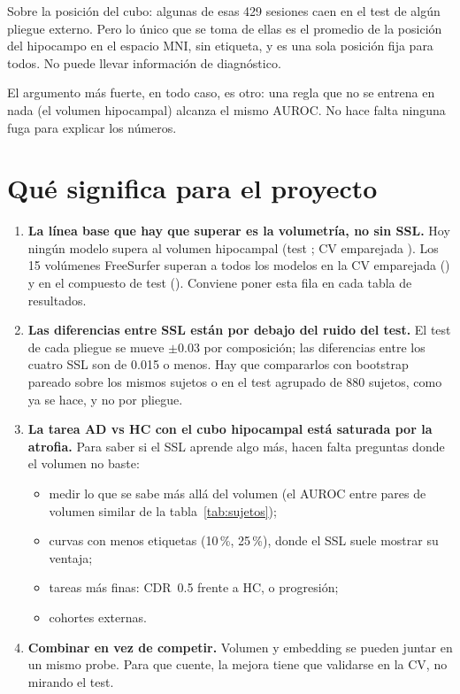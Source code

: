 \documentclass[11pt,a4paper]{article}
\begin{document}
Sobre la posición del cubo: algunas de esas 429 sesiones caen en el test de algún pliegue
externo. Pero lo único que se toma de ellas es el promedio de la posición del hipocampo
en el espacio MNI, sin etiqueta, y es una sola posición fija para todos. No puede llevar
información de diagnóstico.

El argumento más fuerte, en todo caso, es otro: una regla que no se entrena en nada (el
volumen hipocampal) alcanza el mismo AUROC. No hace falta ninguna fuga para explicar
los números.

\section{Qué significa para el proyecto}

\begin{ideabox}
\begin{enumerate}
  \item \textbf{La línea base que hay que superar es la volumetría, no sin SSL.} Hoy
        ningún modelo supera al volumen hipocampal (test \nvolTest; CV emparejada
        \nvolMatched). Los 15 volúmenes FreeSurfer superan a todos los modelos en la CV
        emparejada (\nasegMatched) y en el compuesto de test (\nasegComposite). Conviene
        poner esta fila en cada tabla de resultados.
  \item \textbf{Las diferencias entre SSL están por debajo del ruido del test.} El test
        de cada pliegue se mueve $\pm 0.03$ por composición; las diferencias entre los
        cuatro SSL son de 0.015 o menos. Hay que compararlos con bootstrap pareado
        sobre los mismos sujetos o en el test agrupado de 880 sujetos, como ya se hace,
        y no por pliegue.
  \item \textbf{La tarea AD vs HC con el cubo hipocampal está saturada por la atrofia.}
        Para saber si el SSL aprende algo más, hacen falta preguntas donde el volumen
        no baste:
        \begin{itemize}
          \item medir lo que se sabe más allá del volumen (el AUROC entre pares de
                volumen similar de la tabla~\ref{tab:sujetos});
          \item curvas con menos etiquetas (10\,\%, 25\,\%), donde el SSL suele mostrar
                su ventaja;
          \item tareas más finas: CDR~0.5 frente a HC, o progresión;
          \item cohortes externas.
        \end{itemize}
  \item \textbf{Combinar en vez de competir.} Volumen y embedding se pueden juntar en un
        mismo probe. Para que cuente, la mejora tiene que validarse en la CV, no
        mirando el test.
\end{enumerate}
\end{ideabox}
\end{document}
